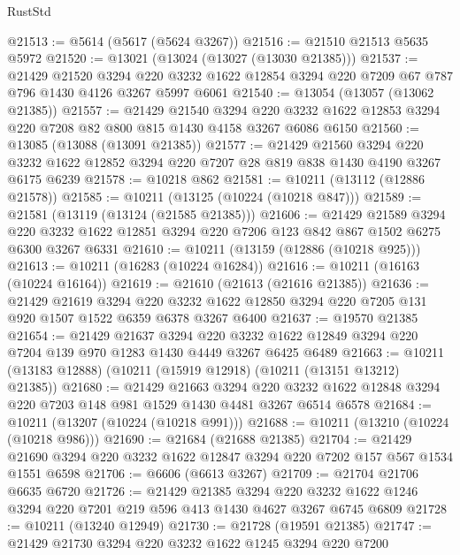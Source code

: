 \begin{lexlean}{RustStd}
\begin{coremodule}
{\begin{coremodule}
{{{{{{{{{{{{{{{{{{{{{{{{{@21513 := @5614 (@5617 (@5624 @3267))
@21516 := @21510 @21513 @5635 @5972
@21520 := @13021 (@13024 (@13027 (@13030 @21385)))
@21537 := @21429
    @21520
    @3294
    @220
    @3232
    @1622
    @12854
    @3294
    @220
    @7209
    @67
    @787
    @796
    @1430
    @4126
    @3267
    @5997
    @6061
@21540 := @13054 (@13057 (@13062 @21385))
@21557 := @21429
    @21540
    @3294
    @220
    @3232
    @1622
    @12853
    @3294
    @220
    @7208
    @82
    @800
    @815
    @1430
    @4158
    @3267
    @6086
    @6150
@21560 := @13085 (@13088 (@13091 @21385))
@21577 := @21429
    @21560
    @3294
    @220
    @3232
    @1622
    @12852
    @3294
    @220
    @7207
    @28
    @819
    @838
    @1430
    @4190
    @3267
    @6175
    @6239
@21578 := @10218 @862
@21581 := @10211 (@13112 (@12886 @21578))
@21585 := @10211 (@13125 (@10224 (@10218 @847)))
@21589 := @21581 (@13119 (@13124 (@21585 @21385)))
@21606 := @21429
    @21589
    @3294
    @220
    @3232
    @1622
    @12851
    @3294
    @220
    @7206
    @123
    @842
    @867
    @1502
    @6275
    @6300
    @3267
    @6331
@21610 := @10211 (@13159 (@12886 (@10218 @925)))
@21613 := @10211 (@16283 (@10224 @16284))
@21616 := @10211 (@16163 (@10224 @16164))
@21619 := @21610 (@21613 (@21616 @21385))
@21636 := @21429
    @21619
    @3294
    @220
    @3232
    @1622
    @12850
    @3294
    @220
    @7205
    @131
    @920
    @1507
    @1522
    @6359
    @6378
    @3267
    @6400
@21637 := @19570 @21385
@21654 := @21429
    @21637
    @3294
    @220
    @3232
    @1622
    @12849
    @3294
    @220
    @7204
    @139
    @970
    @1283
    @1430
    @4449
    @3267
    @6425
    @6489
@21663 := @10211 (@13183 @12888) (@10211 (@15919 @12918) (@10211 (@13151 @13212) @21385))
@21680 := @21429
    @21663
    @3294
    @220
    @3232
    @1622
    @12848
    @3294
    @220
    @7203
    @148
    @981
    @1529
    @1430
    @4481
    @3267
    @6514
    @6578
@21684 := @10211 (@13207 (@10224 (@10218 @991)))
@21688 := @10211 (@13210 (@10224 (@10218 @986)))
@21690 := @21684 (@21688 @21385)
@21704 := @21429 @21690 @3294 @220 @3232 @1622 @12847 @3294 @220 @7202 @157 @567 @1534 @1551 @6598
@21706 := @6606 (@6613 @3267)
@21709 := @21704 @21706 @6635 @6720
@21726 := @21429
    @21385
    @3294
    @220
    @3232
    @1622
    @1246
    @3294
    @220
    @7201
    @219
    @596
    @413
    @1430
    @4627
    @3267
    @6745
    @6809
@21728 := @10211 (@13240 @12949)
@21730 := @21728 (@19591 @21385)
@21747 := @21429
    @21730
    @3294
    @220
    @3232
    @1622
    @1245
    @3294
    @220
    @7200
}}}}}}}}}}}}}}}}}}}}}}}}}
\end{coremodule}}
\end{coremodule}
\end{lexlean}
